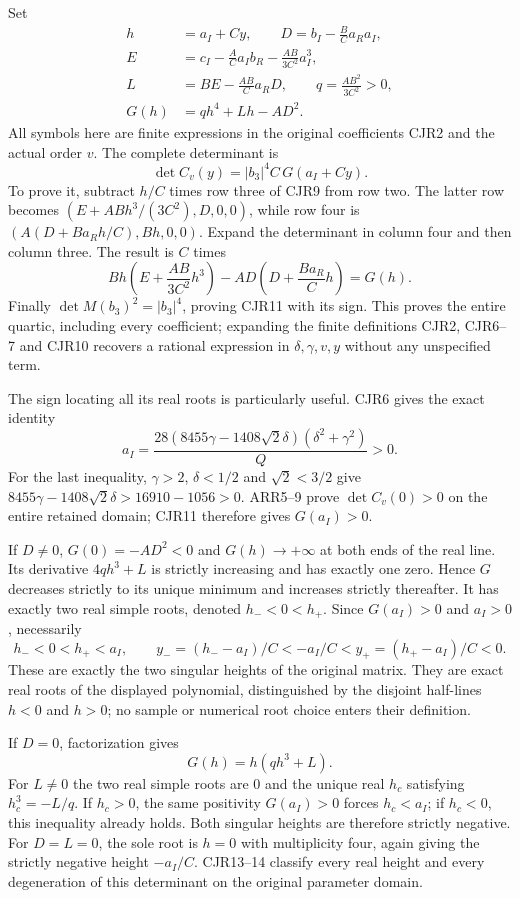 Set
\[
\begin{split}
 h&=a_I+Cy,\qquad D=b_I-\frac{B}{C}a_Ra_I,\\
 E&=c_I-\frac{A}{C}a_Ib_R-\frac{AB}{3C^2}a_I^3,\\
 L&=BE-\frac{AB}{C}a_RD,\qquad
 q=\frac{AB^2}{3C^2}>0,\\
 G(h)&=qh^4+Lh-AD^2.
\end{split}\tag{CJR10}
\]
All symbols here are finite expressions in the original coefficients
CJR2 and the actual order $v$. The complete determinant is
\[
 \boxed{\det C_v(y)=|b_3|^4 C\,
          G(a_I+Cy).}
 \tag{CJR11}
\]
To prove it, subtract $h/C$ times row three of CJR9 from row two.
The latter row becomes
$(E+ABh^3/(3C^2),D,0,0)$, while row four is
$(A(D+Ba_Rh/C),Bh,0,0)$.
Expand the determinant in column four and then column three.
The result is $C$ times
\[
 Bh\left(E+\frac{AB}{3C^2}h^3\right)
     -AD\left(D+\frac{Ba_R}{C}h\right)=G(h).
\]
Finally $\det M(b_3)^2=|b_3|^4$, proving CJR11 with its sign.
This proves the entire quartic, including every coefficient; expanding
the finite definitions CJR2, CJR6--7 and CJR10 recovers a rational
expression in $\delta,\gamma,v,y$ without any unspecified term.

The sign locating all its real roots is particularly useful. CJR6
gives the exact identity
\[
 a_I=\frac{28(8455\gamma-1408\sqrt2\delta)
                   (\delta^2+\gamma^2)}{Q}>0.
 \tag{CJR12}
\]
For the last inequality, $\gamma>2$, $\delta<1/2$ and
$\sqrt2<3/2$ give
$8455\gamma-1408\sqrt2\delta>16910-1056>0$.
ARR5--9 prove $\det C_v(0)>0$ on the entire retained domain;
CJR11 therefore gives $G(a_I)>0$.

If $D\ne0$, $G(0)=-AD^2<0$ and $G(h)\to+\infty$ at both
ends of the real line. Its derivative $4qh^3+L$ is strictly
increasing and has exactly one zero. Hence $G$ decreases strictly
to its unique minimum and increases strictly thereafter. It has
exactly two real simple roots, denoted $h_-<0<h_+$. Since
$G(a_I)>0$ and $a_I>0$, necessarily
\[
 h_-<0<h_+<a_I,\qquad
 y_-=(h_--a_I)/C<-a_I/C<y_+=(h_+-a_I)/C<0.
 \tag{CJR13}
\]
These are exactly the two singular heights of the original matrix.
They are exact real roots of the displayed polynomial, distinguished
by the disjoint half-lines $h<0$ and $h>0$; no sample
or numerical root choice enters their definition.

If $D=0$, factorization gives
\[
 G(h)=h(qh^3+L).
 \tag{CJR14}
\]
For $L\ne0$ the two real simple roots are $0$ and the unique real
$h_c$ satisfying $h_c^3=-L/q$. If $h_c>0$, the same positivity
$G(a_I)>0$ forces $h_c<a_I$; if $h_c<0$, this inequality already
holds. Both singular heights are therefore strictly negative.
For $D=L=0$, the sole root is $h=0$ with multiplicity four,
again giving the strictly negative height $-a_I/C$.
CJR13--14 classify every real height and every degeneration of this
determinant on the original parameter domain.

